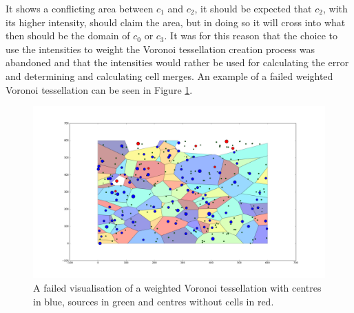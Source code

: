It shows a conflicting area between $c_1$ and $c_2$, it should be expected that $c_2$, with its higher intensity, should claim the area, but in doing so it will cross into what then should be the domain of $c_0$ or $c_3$. It was for this reason that the choice to use the intensities to weight the Voronoi tessellation creation process was abandoned and that the intensities would rather be used for calculating the error and determining and calculating cell merges. An example of a failed weighted Voronoi tessellation can be seen in Figure \ref{fig:w_voronoi}.
\begin{figure}[H]
\includegraphics[width=\textwidth]{Images/weighted_voronoi.png}
\centering
\caption{A failed visualisation of a weighted Voronoi tessellation with centres in blue, sources in green and centres without cells in red.}
\label{fig:w_voronoi}
\end{figure}
